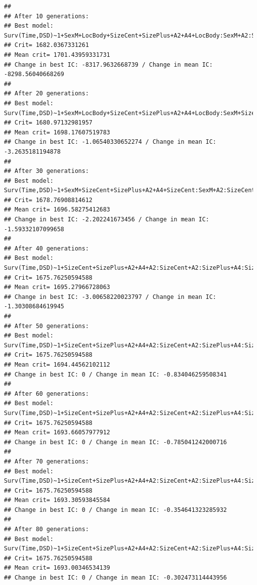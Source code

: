 \documentclass{article}\usepackage[]{graphicx}\usepackage[]{color}
\makeatletter
\newenvironment{kframe}{%
 \def\at@end@of@kframe{}%
 \ifinner\ifhmode%
  \def\at@end@of@kframe{\end{minipage}}%
  \begin{minipage}{\columnwidth}%
 \fi\fi%
 \def\FrameCommand##1{\hskip\@totalleftmargin \hskip-\fboxsep
 \colorbox{shadecolor}{##1}\hskip-\fboxsep
     \hskip-\linewidth \hskip-\@totalleftmargin \hskip\columnwidth}%
 \MakeFramed {\advance\hsize-\width
   \@totalleftmargin\z@ \linewidth\hsize
   \@setminipage}}%
 {\par\unskip\endMakeFramed%
 \at@end@of@kframe}
\newenvironment{knitrout}{}{} %
\makeatother
\begin{document}
\begin{knitrout}
\begin{kframe}
{\ttfamily\noindent\color{warningcolor}{\#\# Warning in fitter(X, Y, strats, offset, init, control, weights = weights, : Loglik converged before variable\ \ 6 ; beta may be infinite.}}\begin{verbatim}
## 
## After 10 generations:
## Best model: Surv(Time,DSD)~1+SexM+LocBody+SizeCent+SizePlus+A2+A4+LocBody:SexM+A2:SizeCent+A2:SizePlus+A4:SizeCent
## Crit= 1682.0367331261
## Mean crit= 1701.43959331731
## Change in best IC: -8317.9632668739 / Change in mean IC: -8298.56040668269
## 
## After 20 generations:
## Best model: Surv(Time,DSD)~1+SexM+LocBody+SizeCent+SizePlus+A2+A4+LocBody:SexM+SizePlus:SexM+A2:SizeCent+A2:SizePlus+A4:SizeCent
## Crit= 1680.97132981957
## Mean crit= 1698.17607519783
## Change in best IC: -1.06540330652274 / Change in mean IC: -3.2635181194878
## 
## After 30 generations:
## Best model: Surv(Time,DSD)~1+SexM+SizeCent+SizePlus+A2+A4+SizeCent:SexM+A2:SizeCent+A2:SizePlus+A4:SizeCent
## Crit= 1678.76908814612
## Mean crit= 1696.58275412683
## Change in best IC: -2.202241673456 / Change in mean IC: -1.59332107099658
## 
## After 40 generations:
## Best model: Surv(Time,DSD)~1+SizeCent+SizePlus+A2+A4+A2:SizeCent+A2:SizePlus+A4:SizeCent+A4:A2
## Crit= 1675.76250594588
## Mean crit= 1695.27966728063
## Change in best IC: -3.00658220023797 / Change in mean IC: -1.30308684619945
## 
## After 50 generations:
## Best model: Surv(Time,DSD)~1+SizeCent+SizePlus+A2+A4+A2:SizeCent+A2:SizePlus+A4:SizeCent+A4:A2
## Crit= 1675.76250594588
## Mean crit= 1694.44562102112
## Change in best IC: 0 / Change in mean IC: -0.834046259508341
## 
## After 60 generations:
## Best model: Surv(Time,DSD)~1+SizeCent+SizePlus+A2+A4+A2:SizeCent+A2:SizePlus+A4:SizeCent+A4:A2
## Crit= 1675.76250594588
## Mean crit= 1693.66057977912
## Change in best IC: 0 / Change in mean IC: -0.785041242000716
## 
## After 70 generations:
## Best model: Surv(Time,DSD)~1+SizeCent+SizePlus+A2+A4+A2:SizeCent+A2:SizePlus+A4:SizeCent+A4:A2
## Crit= 1675.76250594588
## Mean crit= 1693.30593845584
## Change in best IC: 0 / Change in mean IC: -0.354641323285932
## 
## After 80 generations:
## Best model: Surv(Time,DSD)~1+SizeCent+SizePlus+A2+A4+A2:SizeCent+A2:SizePlus+A4:SizeCent+A4:A2
## Crit= 1675.76250594588
## Mean crit= 1693.00346534139
## Change in best IC: 0 / Change in mean IC: -0.302473114443956
\end{verbatim}



\end{kframe}
\end{knitrout}
\end{document}
